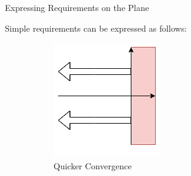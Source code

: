 \documentclass{../templates/topic}
\begin{document}
\begin{section}{Expressing Requirements on the Plane}
	
	Simple requirements can be expressed as follows:
	
	\begin{figure}
		\centering
		
		\begin{subfigure}[b]{0.4\textwidth}
		\includegraphics[width=\textwidth]{complex_plane_convergence.png}
		\caption{Quicker Convergence}
		\end{subfigure}
		\begin{subfigure}[b]{0.4\textwidth}

\end{subfigure}
\end{figure}
\end{section}
\end{document}
